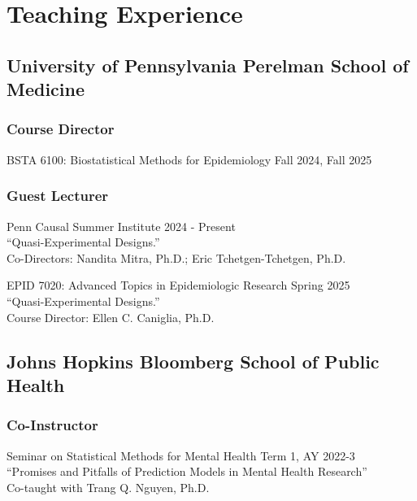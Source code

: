 \documentclass[letterpaper,11pt]{article} %
\begin{document}
	
	\section*{Teaching Experience}

        \subsection*{University of Pennsylvania Perelman School of Medicine}

        \subsubsection*{Course Director}
        \begin{etaremune}
            \item BSTA 6100: Biostatistical Methods for Epidemiology \hfill Fall 2024, Fall 2025
        \end{etaremune}
        
        \subsubsection*{Guest Lecturer}
        \begin{etaremune}
            \item Penn Causal Summer Institute \hfill 2024 - Present \\
            ``Quasi-Experimental Designs.'' \\
            Co-Directors: Nandita Mitra, Ph.D.; Eric Tchetgen-Tchetgen, Ph.D.
            \item EPID 7020: Advanced Topics in Epidemiologic Research \hfill Spring 2025 \\
            ``Quasi-Experimental Designs.'' \\
            Course Director: Ellen C. Caniglia, Ph.D.
        \end{etaremune}
	
		\subsection*{Johns Hopkins Bloomberg School of Public Health}
	
		\subsubsection*{Co-Instructor}
		\begin{etaremune}
		    \item Seminar on Statistical Methods for Mental Health \hfill Term 1, AY 2022-3 \\
			``Promises and Pitfalls of Prediction Models in Mental Health Research'' \\
			Co-taught with Trang Q. Nguyen, Ph.D.
		\end{etaremune}
		
\end{document}
